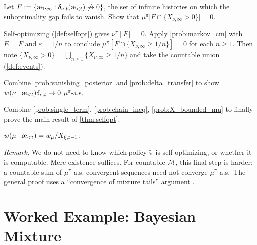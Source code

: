 \documentclass[fontsize=11pt, parskip=half]{scrartcl}
\renewcommand{\thesection}{\arabic{section}}
\newcommand{\cM}{\mathcal{M}}
\newcommand{\aes}{\textnormal{\ae}}
\begin{document}
\begin{exercise}
\label{prob:delta_transfer}
Let $F := \{\aes_{1:\infty} : \delta_{\nu,t}(\aes_{<t}) \not\to 0\}$, the set of infinite histories on which the suboptimality gap fails to vanish. Show that $\mu^\pi\big[F \cap \{X_{\nu,\infty} > 0\}\big] = 0$.


\begin{hint}
Self-optimizing (\cref{def:selfopt}) gives $\nu^\pi[F] = 0$. Apply \cref{prob:markov_cm} with $E = F$ and $\varepsilon = 1/n$ to conclude $\mu^\pi[F \cap \{X_{\nu,\infty} \geq 1/n\}] = 0$ for each $n \geq 1$. Then note $\{X_{\nu,\infty} > 0\} = \bigcup_{n \geq 1} \{X_{\nu,\infty} \geq 1/n\}$ and take the countable union (\cref{def:events}).
\end{hint}
\end{exercise}


\begin{exercise}
\label{prob:single_term}
Combine \cref{prob:vanishing_posterior} and \cref{prob:delta_transfer} to show $w(\nu \mid \aes_{<t}) \delta_{\nu,t} \to 0$ $\mu^\pi$-a.s.

\end{exercise}


\begin{exercise}
\label{prob:auto6}
Combine \cref{prob:single_term}, \cref{prob:chain_ineq}, \cref{prob:X_bounded_mu} to finally prove the
 main result of \cref{thm:selfopt}.


\begin{hint}
$w(\mu \mid \aes_{<t}) = w_\mu/X_{\xi,t-1}$.
\end{hint}
\end{exercise}


\textit{Remark.} We do not need to know which policy $\tilde\pi$ is self-optimizing, or whether it is computable. Mere existence suffices.
For countable $\cM$, this final step is harder: a countable sum of $\mu^\pi$-a.s.-convergent sequences need not converge $\mu^\pi$-a.s.\ The general proof uses a ``convergence of mixture tails'' argument \cite[Lem.~5.28]{Hutter:04uaibook}.

\clearpage
\appendix
\renewcommand{\thesection}{\Alph{section}}

\section{Worked Example: Bayesian Mixture}\label{sec:appendix_mixture}
\end{document}
